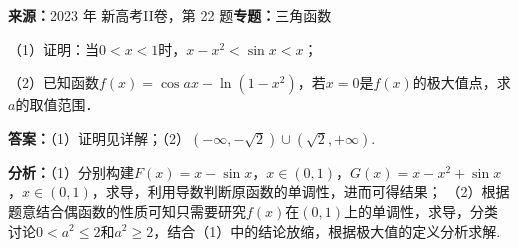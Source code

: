 \begin{question}[points=10]
\textbf{来源：}2023 年 新高考II卷，第 22 题\quad \textbf{专题：}三角函数\par
（1）证明：当$0<x<1$时，$x-x^{2}<\sin x<x$；

（2）已知函数$f(x)=\cos ax-\ln(1-x^{2})$，若$x=0$是$f(x)$的极大值点，求$a$的取值范围．
\begin{solution}
\textbf{答案：}（1）证明见详解；（2）$(-\infty,-\sqrt{2})\cup(\sqrt{2},+\infty)$.

\textbf{分析：}（1）分别构建$F(x)=x-\sin x$，$x\in(0,1)$，$G(x)=x-x^{2}+\sin x$，$x\in(0,1)$，求导，利用导数判断原函数的单调性，进而可得结果；
（2）根据题意结合偶函数的性质可知只需要研究$f(x)$在$(0,1)$上的单调性，求导，分类讨论$0<a^{2}\le 2$和$a^{2}\ge 2$，结合（1）中的结论放缩，根据极大值的定义分析求解.


\end{solution}
\end{question}
